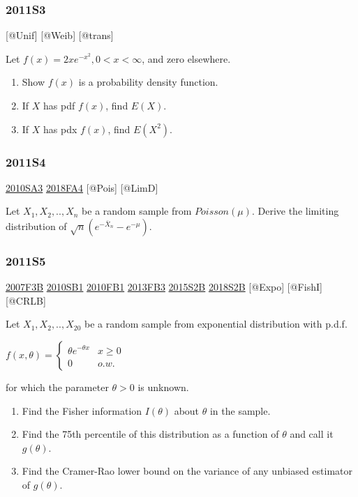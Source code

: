 \documentclass[6pt,Portrait]{article}
\begin{document}
\hypertarget{s3-2}{%
\subsubsection{2011S3}\label{s3-2}}

{[}@Unif{]} {[}@Weib{]} {[}@trans{]}

Let \(f(x)=2xe^{-x^2},0<x<\infty\), and zero elsewhere.

\begin{enumerate}
\def\labelenumi{(\alph{enumi})}
\item
  Show \(f(x)\) is a probability density function.
\item
  If \(X\) has pdf \(f(x)\), find \(E(X)\).
\item
  If \(X\) has pdx \(f(x)\), find \(E(X^2)\).
\end{enumerate}

\hypertarget{s4-2}{%
\subsubsection{2011S4}\label{s4-2}}

\protect\hyperlink{sa3-1}{2010SA3} \protect\hyperlink{fa4-4}{2018FA4}
{[}@Pois{]} {[}@LimD{]}

Let \(X_1,X_2,..,X_n\) be a random sample from \(Poisson(\mu)\). Derive
the limiting distribution of \(\sqrt{n}(e^{-\bar X_n}-e^{-\mu})\).

\hypertarget{s5-2}{%
\subsubsection{2011S5}\label{s5-2}}

\protect\hyperlink{f3b}{2007F3B} \protect\hyperlink{sb1-1}{2010SB1}
\protect\hyperlink{fb1-1}{2010FB1} \protect\hyperlink{fb3-2}{2013FB3}
\protect\hyperlink{s2b-1}{2015S2B} \protect\hyperlink{s2b-2}{2018S2B}
{[}@Expo{]} {[}@FishI{]} {[}@CRLB{]}

Let \(X_1,X_2,..,X_{20}\) be a random sample from exponential
distribution with p.d.f.

\(f(x,\theta)=\begin{cases}\theta e^{-\theta x}& x\ge0\\0& o.w.\end{cases}\)

for which the parameter \(\theta>0\) is unknown.

\begin{enumerate}
\def\labelenumi{(\alph{enumi})}
\item
  Find the Fisher information \(I(\theta)\) about \(\theta\) in the
  sample.
\item
  Find the 75th percentile of this distribution as a function of
  \(\theta\) and call it \(g(\theta)\).
\item
  Find the Cramer-Rao lower bound on the variance of any unbiased
  estimator of \(g(\theta)\).
\end{enumerate}
\end{document}
